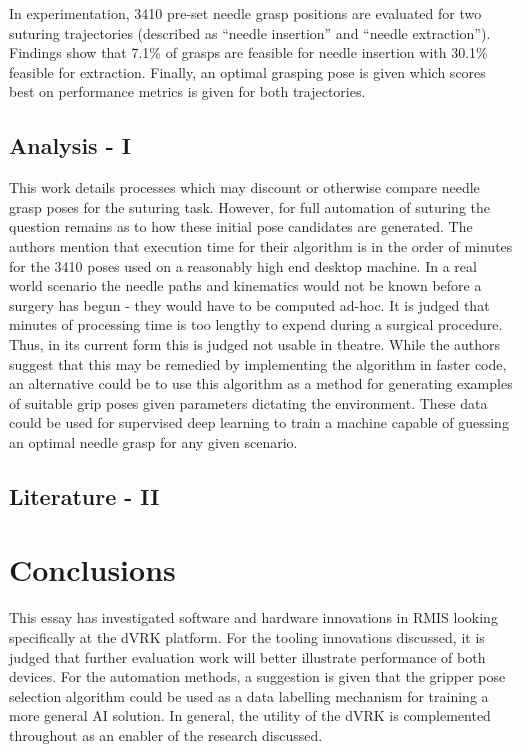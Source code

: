 \documentclass[english]{sobraep}
\begin{document}
In experimentation, 3410 pre-set needle grasp positions are evaluated for two suturing trajectories (described as ``needle insertion'' and ``needle extraction''). Findings show that 7.1\% of grasps are feasible for needle insertion with 30.1\% feasible for extraction. Finally, an optimal grasping pose is given which scores best on performance metrics is given for both trajectories. 

\subsection{Analysis - I}
This work details processes which may discount or otherwise compare needle grasp poses for the suturing task. However, for full automation of suturing the question remains as to how these initial pose candidates are generated. The authors mention that execution time for their algorithm is in the order of minutes for the 3410 poses used on a reasonably high end desktop machine. In a real world scenario the needle paths and kinematics would not be known before a surgery has begun - they would have to be computed ad-hoc. It is judged that minutes of processing time is too lengthy to expend during a surgical procedure. Thus, in its current form this is judged not usable in theatre. While the authors suggest that this may be remedied by implementing the algorithm in faster code, an alternative could be to use this algorithm as a method for generating examples of suitable grip poses given parameters dictating the environment. These data could be used for supervised deep learning to train a machine capable of guessing an optimal needle grasp for any given scenario.   
\subsection{Literature - II}



\section{Conclusions}
This essay has investigated software and hardware innovations in RMIS looking specifically at the dVRK platform. For the tooling innovations discussed, it is judged that further evaluation work will better illustrate performance of both devices. For the automation methods, a suggestion is given that the gripper pose selection algorithm could be used as a data labelling mechanism for training a more general AI solution. In general, the utility of the dVRK is complemented throughout as an enabler of the research discussed. 

\printbibliography
\end{document}
